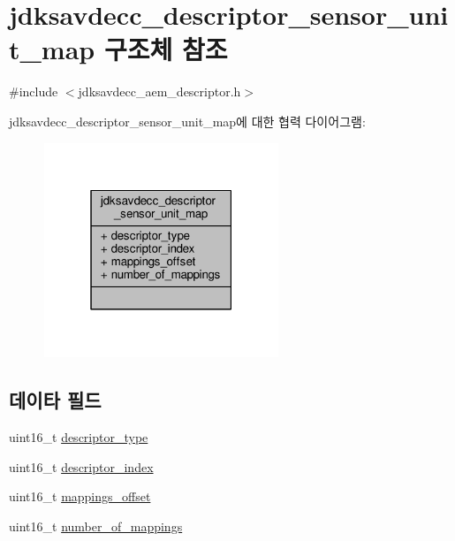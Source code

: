 \hypertarget{structjdksavdecc__descriptor__sensor__unit__map}{}\section{jdksavdecc\+\_\+descriptor\+\_\+sensor\+\_\+unit\+\_\+map 구조체 참조}
\label{structjdksavdecc__descriptor__sensor__unit__map}


{\ttfamily \#include $<$jdksavdecc\+\_\+aem\+\_\+descriptor.\+h$>$}



jdksavdecc\+\_\+descriptor\+\_\+sensor\+\_\+unit\+\_\+map에 대한 협력 다이어그램\+:
\nopagebreak
\begin{figure}[H]
\begin{center}
\leavevmode
\includegraphics[width=199pt]{structjdksavdecc__descriptor__sensor__unit__map__coll__graph}
\end{center}
\end{figure}
\subsection*{데이타 필드}
\begin{DoxyCompactItemize}
\item 
uint16\+\_\+t \hyperlink{structjdksavdecc__descriptor__sensor__unit__map_ab7c32b6c7131c13d4ea3b7ee2f09b78d}{descriptor\+\_\+type}
\item 
uint16\+\_\+t \hyperlink{structjdksavdecc__descriptor__sensor__unit__map_a042bbc76d835b82d27c1932431ee38d4}{descriptor\+\_\+index}
\item 
uint16\+\_\+t \hyperlink{structjdksavdecc__descriptor__sensor__unit__map_ac91a41273e32c7bf86ca390838721642}{mappings\+\_\+offset}
\item 
uint16\+\_\+t \hyperlink{structjdksavdecc__descriptor__sensor__unit__map_ac7db472c5622ef473d5d0a5c416d5531}{number\+\_\+of\+\_\+mappings}
\end{DoxyCompactItemize}


